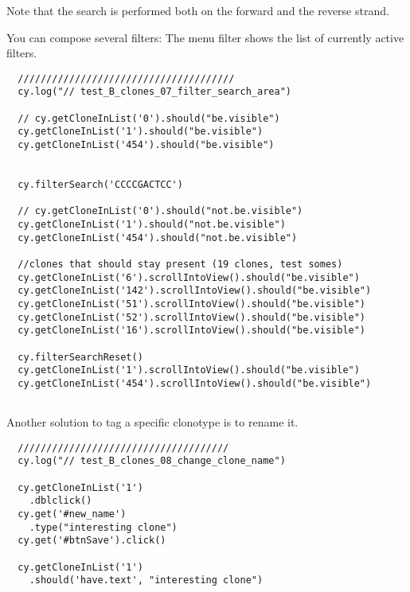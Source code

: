 Note that the search is performed both on the forward and the reverse strand.

You can compose several filters:
The menu filter shows the list of currently active filters.

\begin{verbatim}
  //////////////////////////////////////
  cy.log("// test_B_clones_07_filter_search_area")

  // cy.getCloneInList('0').should("be.visible")
  cy.getCloneInList('1').should("be.visible")
  cy.getCloneInList('454').should("be.visible")


  cy.filterSearch('CCCCGACTCC')

  // cy.getCloneInList('0').should("not.be.visible")
  cy.getCloneInList('1').should("not.be.visible")
  cy.getCloneInList('454').should("not.be.visible")

  //clones that should stay present (19 clones, test somes)
  cy.getCloneInList('6').scrollIntoView().should("be.visible")
  cy.getCloneInList('142').scrollIntoView().should("be.visible")
  cy.getCloneInList('51').scrollIntoView().should("be.visible")
  cy.getCloneInList('52').scrollIntoView().should("be.visible")
  cy.getCloneInList('16').scrollIntoView().should("be.visible")

  cy.filterSearchReset()
  cy.getCloneInList('1').scrollIntoView().should("be.visible")
  cy.getCloneInList('454').scrollIntoView().should("be.visible")


\end{verbatim}  
\bigskip

Another solution to tag a specific clonotype is to rename it.
\begin{verbatim}
  /////////////////////////////////////
  cy.log("// test_B_clones_08_change_clone_name")

  cy.getCloneInList('1')
    .dblclick()
  cy.get('#new_name')
    .type("interesting clone")
  cy.get('#btnSave').click()

  cy.getCloneInList('1')
    .should('have.text', "interesting clone")

\end{verbatim}

